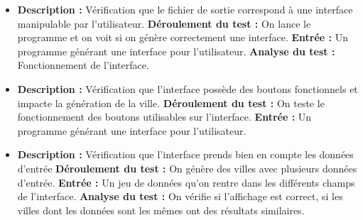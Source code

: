 {}
{
\begin{itemize}

  \item \textbf{Description : } Vérification que le fichier de sortie correspond à une interface manipulable par l'utilisateur.\newline
  \textbf{Déroulement du test : } On lance le programme et on voit si on génère correctement une interface. \newline
  \textbf{Entrée : } Un programme générant une interface pour l'utilisateur. \newline
  \textbf{ Analyse du test : } Fonctionnement de l'interface.
  
  \item \textbf{ Description : }Vérification que l'interface possède des boutons fonctionnels et impacte la génération de la ville. \newline
  \textbf{Déroulement du test : } On teste le fonctionnement des boutons utilisables sur l'interface. \newline
  \textbf{ Entrée : } Un programme générant une interface pour l'utilisateur.

  \item \textbf{ Description : }Vérification que l'interface prends bien en compte les données d'entrée \newline
  \textbf{Déroulement du test : } On génère des villes avec plusieurs données d'entrée. \newline
  \textbf{ Entrée : } Un jeu de données qu'on rentre dans les différents champs de l'interface. \newline
  \textbf{ Analyse du test : } On vérifie si l'affichage est correct, si les villes dont les données sont les mêmes ont des résultats similaires.
\end{itemize}
}